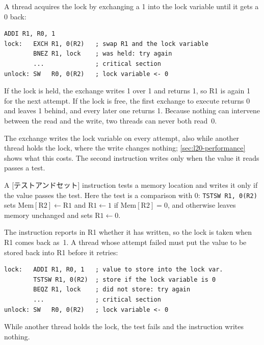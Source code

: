 \documentclass[../main.tex]{subfiles}
\begin{document}
A thread acquires the lock by exchanging a 1 into the lock variable until it
gets a 0 back:
\begin{lstlisting}[language={[x86masm]Assembler}, numbers=none, deletekeywords={lock}]
        ADDI R1, R0, 1
lock:   EXCH R1, 0(R2)   ; swap R1 and the lock variable
        BNEZ R1, lock    ; was held: try again
        ...              ; critical section
unlock: SW   R0, 0(R2)   ; lock variable <- 0
\end{lstlisting}
If the lock is held, the exchange writes 1 over 1 and returns 1, so R1 is
again 1 for the next attempt.  If the lock is free, the first exchange to
execute returns 0 and leaves 1 behind, and every later one returns 1.
Because nothing can intervene between the read and the write, two threads
can never both read~0.

The exchange writes the lock variable on every attempt, also while another
thread holds the lock, where the write changes nothing;
\cref{sec:l20-performance} shows what this costs.  The second instruction
writes only when the value it reads passes a test.

\begin{definition}
  A [テストアンドセット] instruction tests a memory
  location and writes it only if the value passes the test.  Here the test
  is a comparison with 0: \texttt{TSTSW R1, 0(R2)} sets
  $\text{Mem}[\text{R2}] \leftarrow \text{R1}$ and
  $\text{R1} \leftarrow 1$ if $\text{Mem}[\text{R2}] = 0$, and otherwise
  leaves memory unchanged and sets $\text{R1} \leftarrow 0$.
\end{definition}

The instruction reports in R1 whether it has written, so the lock is taken
when R1 comes back as~1.  A thread whose attempt failed must
put the value to be stored back into R1 before it retries:
\begin{lstlisting}[language={[x86masm]Assembler}, numbers=none, deletekeywords={lock}]
lock:   ADDI R1, R0, 1   ; value to store into the lock var.
        TSTSW R1, 0(R2)  ; store if the lock variable is 0
        BEQZ R1, lock    ; did not store: try again
        ...              ; critical section
unlock: SW   R0, 0(R2)   ; lock variable <- 0
\end{lstlisting}
While another thread holds the lock, the test fails and the instruction
writes nothing.
\end{document}
